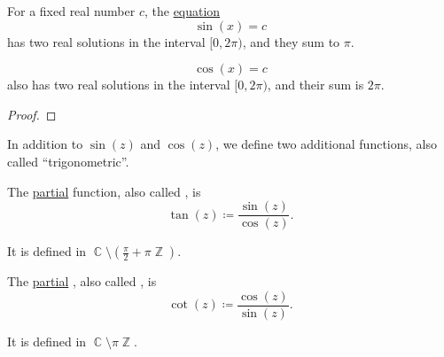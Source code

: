 \begin{corollary}\label{thm:trigonometric_angle_equations}
  For a fixed real number \( c \), the \hyperref[def:equation]{equation}
  \begin{equation}\label{eq:thm:trigonometric_angle_equations/sin}
    \sin(x) = c
  \end{equation}
  has two real solutions in the interval \( [0, 2\pi) \), and they sum to \( \pi \).

  \begin{equation}\label{eq:thm:trigonometric_angle_equations/cos}
    \cos(x) = c
  \end{equation}
  also has two real solutions in the interval \( [0, 2\pi) \), and their sum is \( 2\pi \).
\end{corollary}
\begin{proof}
\end{proof}

\begin{definition}\label{def:derived_trigonometric_functions}
  In addition to \( \sin(z) \) and \( \cos(z) \), we define two additional functions, also called \enquote{trigonometric}.

  \begin{thmenum}
     The \hyperref[def:partial_function]{partial}  function, also called , is
    \begin{equation*}
      \tan(z) \coloneqq \frac {\sin(z)} {\cos(z)}.
    \end{equation*}

    It is defined in \( \BbbC \setminus (\tfrac \pi 2 + \pi\BbbZ) \).

     The \hyperref[def:partial_function]{partial} , also called , is
    \begin{equation*}
      \cot(z) \coloneqq \frac {\cos(z)} {\sin(z)}.
    \end{equation*}

    It is defined in \( \BbbC \setminus \pi\BbbZ \).
  \end{thmenum}
\end{definition}

